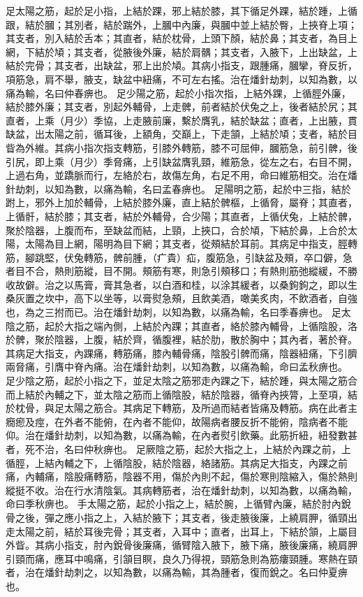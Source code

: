 足太陽之筋，起於足小指，上結於踝，邪上結於膝，其下循足外踝，結於踵，上循跟，結於膕；其別者，結於踹外，上膕中內廉，與膕中並上結於臀，上挾脊上項；其支者，別入結於舌本；其直者，結於枕骨，上頭下顏，結於鼻；其支者，為目上網，下結於頄；其支者，從腋後外廉，結於肩髃；其支者，入腋下，上出缺盆，上結於完骨；其支者，出缺盆，邪上出於頄。其病小指支，跟腫痛，膕攣，脊反折，項筋急，肩不舉，腋支，缺盆中紐痛，不可左右搖。治在燔針劫刺，以知為數，以痛為輸，名曰仲春痹也。
足少陽之筋，起於小指次指，上結外踝，上循脛外廉，結於膝外廉；其支者，別起外輔骨，上走髀，前者結於伏兔之上，後者結於尻；其直者，上乘（月少）季協，上走腋前廉，繫於膺乳，結於缺盆；直者，上出腋，貫缺盆，出太陽之前，循耳後，上額角，交巔上，下走頷，上結於頄；支者，結於目眥為外維。其病小指次指支轉筋，引膝外轉筋，膝不可屈伸，膕筋急，前引髀，後引尻，即上乘（月少）季脅痛，上引缺盆膺乳頸，維筋急，從左之右，右目不開，上過右角，並蹻脈而行，左絡於右，故傷左角，右足不用，命曰維筋相交。治在燔針劫刺，以知為數，以痛為輸，名曰孟春痹也。
足陽明之筋，起於中三指，結於跗上，邪外上加於輔骨，上結於膝外廉，直上結於髀樞，上循脅，屬脊；其直者，上循骭，結於膝；其支者，結於外輔骨，合少陽；其直者，上循伏兔，上結於髀，聚於陰器，上腹而布，至缺盆而結，上頸，上挾口，合於頄，下結於鼻，上合於太陽，太陽為目上網，陽明為目下網；其支者，從頰結於耳前。其病足中指支，脛轉筋，腳跳堅，伏兔轉筋，髀前腫，（疒貴）疝，腹筋急，引缺盆及頰，卒口僻，急者目不合，熱則筋縱，目不開。頰筋有寒，則急引頰移口；有熱則筋弛縱緩，不勝收故僻。治之以馬膏，膏其急者，以白酒和桂，以涂其緩者，以桑鉤鉤之，即以生桑灰置之坎中，高下以坐等，以膏熨急頰，且飲美酒，噉美炙肉，不飲酒者，自強也，為之三拊而已。治在燔針劫刺，以知為數，以痛為輸，名曰季春痹也。
足太陰之筋，起於大指之端內側，上結於內踝；其直者，絡於膝內輔骨，上循陰股，洛於髀，聚於陰器，上腹，結於齊，循腹裡，結於肋，散於胸中；其內者，著於脊。其病足大指支，內踝痛，轉筋痛，膝內輔骨痛，陰股引髀而痛，陰器紐痛，下引臍兩脅痛，引膺中脊內痛。治在燔針劫刺，以知為數，以痛為輸，命曰孟秋痹也。
足少陰之筋，起於小指之下，並足太陰之筋邪走內踝之下，結於踵，與太陽之筋合而上結於內輔之下，並太陰之筋而上循陰股，結於陰器，循脊內挾膂，上至項，結於枕骨，與足太陽之筋合。其病足下轉筋，及所過而結者皆痛及轉筋。病在此者主癇瘛及痙，在外者不能俯，在內者不能仰，故陽病者腰反折不能俯，陰病者不能仰。治在燔針劫刺，以知為數，以痛為輸，在內者熨引飲藥。此筋折紐，紐發數甚者，死不治，名曰仲秋痹也。
足厥陰之筋，起於大指之上，上結於內踝之前，上循脛，上結內輔之下，上循陰股，結於陰器，絡諸筋。其病足大指支，內踝之前痛，內輔痛，陰股痛轉筋，陰器不用，傷於內則不起，傷於寒則陰縮入，傷於熱則縱挺不收。治在行水清陰氣。其病轉筋者，治在燔針劫刺，以知為數，以痛為輸，命曰季秋痹也。
手太陽之筋，起於小指之上，結於腕，上循臂內廉，結於肘內銳骨之後，彈之應小指之上，入結於腋下；其支者，後走腋後廉，上繞肩胛，循頸出走太陽之前，結於耳後完骨；其支者，入耳中；直者，出耳上，下結於頷，上屬目外眥。其病小指支，肘內銳骨後廉痛，循臂陰入腋下，腋下痛，腋後廉痛，繞肩胛引頸而痛，應耳中鳴痛，引頷目瞑，良久乃得視，頸筋急則為筋瘻頸腫。寒熱在頸者，治在燔針劫刺之，以知為數，以痛為輸，其為腫者，復而銳之。名曰仲夏痹也。
